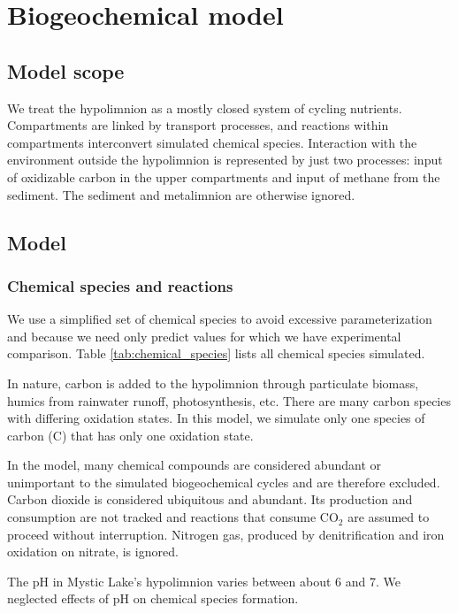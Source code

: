 \documentclass{report}
\begin{document}
\chapter{Biogeochemical model}
\section{Model scope}
We treat the hypolimnion as a mostly closed system of cycling nutrients. Compartments are linked by transport processes, and reactions within compartments interconvert simulated chemical species. Interaction with the environment outside the hypolimnion is represented by just two processes: input of oxidizable carbon in the upper compartments and input of methane from the sediment. The sediment and metalimnion are otherwise ignored.

\section{Model}
\subsection{Chemical species and reactions}
We use a simplified set of chemical species to avoid excessive parameterization and
because we need only predict values for which we have experimental comparison. Table
\ref{tab:chemical_species} lists all chemical species simulated.

In nature, carbon is added to the hypolimnion through particulate biomass, humics from rainwater runoff, photosynthesis, etc. There are many carbon species with differing oxidation states. In this model, we simulate only one species of carbon (C) that has only one oxidation state.

In the model, many chemical compounds are considered abundant or unimportant to the simulated biogeochemical cycles and are therefore excluded. Carbon dioxide is considered ubiquitous and abundant. Its production and consumption are not tracked and reactions that consume
CO$_2$ are assumed to proceed without interruption. Nitrogen gas, produced by denitrification
and iron oxidation on nitrate, is ignored.

The pH in Mystic Lake's hypolimnion varies between about 6 and 7. We neglected effects of pH on chemical species formation.
\end{document}
